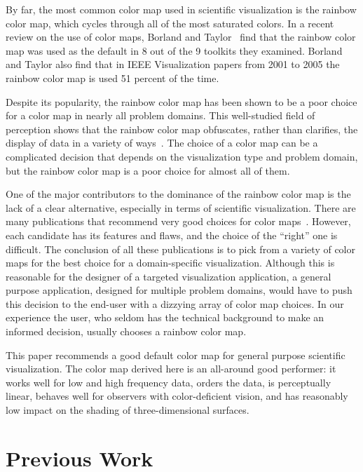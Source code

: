 \documentclass{llncs}
\newcommand{\lcite}[1]{~\cite{#1}}
\newcommand{\scite}[1]{~\cite{#1}}
\begin{document}
By far, the most common color map used in scientific visualization is the
rainbow color map, which cycles through all of the most
saturated colors.  In a recent review on the use of color maps, Borland and
Taylor\scite{Borland07} find that the rainbow color map was used as the
default in 8 out of the 9 toolkits they examined.  Borland and Taylor also
find that in IEEE Visualization papers from 2001 to 2005 the rainbow color
map is used 51 percent of the time.

Despite its popularity, the rainbow color map has been shown to be a poor
choice for a color map in nearly all problem domains.  This well-studied
field of perception shows that the rainbow color map obfuscates, rather
than clarifies, the display of data in a variety of ways\lcite{Borland07}.
The choice of a color map can be a complicated decision that depends on the
visualization type and problem domain, but the rainbow color map is a poor
choice for almost all of them.

One of the major contributors to the dominance of the rainbow color map is the
lack of a clear alternative, especially in terms of scientific
visualization.  There are many publications that recommend
very good choices for color maps\lcite{Brewer05,Levkowitz92,Rheingans99,Ware04}.
However, each candidate has its features and flaws, and the choice of
the ``right'' one is difficult.  The conclusion of
all these publications is to pick from a variety of color maps for the best
choice for a domain-specific visualization.  Although this is reasonable
for the designer of a targeted visualization application, a general
purpose application, designed for multiple problem domains, would have to
push this decision to the end-user with a dizzying array of color map
choices.  In our experience the user, who seldom has the technical
background to make an informed decision, usually chooses a rainbow color map.

This paper recommends a good default
color map for general purpose scientific visualization.  The
color map derived here is an all-around good performer: it works well for
low and high frequency data, orders the data, is perceptually linear,
behaves well for observers with color-deficient vision, and has reasonably
low impact on the shading of three-dimensional surfaces.


\section{Previous Work}
\label{sec:PreviousWork}
\end{document}
